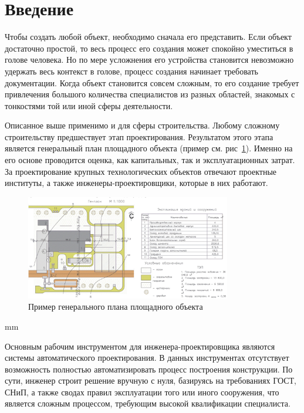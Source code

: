\section*{\Large{Введение}}


Чтобы создать любой объект, необходимо сначала его представить.
Если объект достаточно простой, то весь процесс его создания может спокойно уместиться в голове человека.
Но по мере усложнения его устройства становится невозможно удержать весь контекст в голове,
процесс создания начинает требовать документации.
Когда объект становится совсем сложным, то его создание требует привлечения большого количества специалистов из разных
областей, знакомых с тонкостями той или иной сферы деятельности.

Описанное выше применимо и для сферы строительства.
Любому сложному строительству предшествует этап проектирования.
Результатом этого этапа является генеральный план площадного объекта (пример см. рис\ \ref{pic:introduction__site-plan}).
Именно на его основе проводится оценка, как капитальных, так и эксплуатационных затрат.
За проектирование крупных технологических объектов отвечают проектные институты,
а также инженеры-проектировщики, которые в них работают.

\begin{figure}[H]
	\vspace*{-0.4 cm}
	\includegraphics[width=0.8\textwidth]{introduction/pictures/site_plan}
	\caption{Пример генерального плана площадного объекта}
	\label{pic:introduction__site-plan}
\end{figure}
 mm

Основным рабочим инструментом для инженера-проектировщика являются системы автоматического проектирования.
В данных инструментах отсутствует возможность полностью автоматизировать процесс построения конструкции.
По сути, инженер строит решение вручную с нуля, базируясь на требованиях ГОСТ, СНиП, а также сводах правил
эксплуатации того или иного сооружения, что является сложным процессом, требующим высокой квалификации специалиста.
